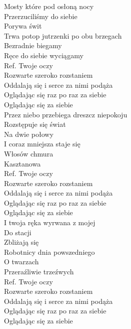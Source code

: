 
Mosty które pod osłoną nocy \tab{} \\
Przerzuciliśmy do siebie  \tab{}\\
Porywa świt  \tab{}\tab{}\\
Trwa potop jutrzenki po obu brzegach \\
Bezradnie biegamy \tab{}\\
Ręce do siebie wyciągamy \tab{} \\
\hops
Ref. Twoje oczy \tab{}\\
 Rozwarte szeroko rozstaniem \\
 Oddalają się i serce za nimi podąża \\
 Oglądając się raz po raz za siebie \\
 Oglądając się za siebie \tab{}\\
\hops
Przez niebo przebiega dreszcz niepokoju \\
Rozstępuje się świat \\
Na dwie połowy \\
I coraz mniejsza staje się \\
Włosów chmura \\
Kasztanowa \\
\hops
Ref. Twoje oczy\\
 Rozwarte szeroko rozstaniem \\
 Oddalają się i serce za nimi podąża \\
 Oglądając się raz po raz za siebie \\
 Oglądając się za siebie \\
\hops
I twoja ręka wyrwana z mojej \\
Do stacji \\
Zbliżają się \\
Robotnicy dnia powszedniego \\
O twarzach \\
Przeraźliwie trzeźwych \\
\hops
Ref. Twoje oczy\\
 Rozwarte szeroko rozstaniem \\
 Oddalają się i serce za nimi podąża \\
 Oglądając się raz po raz za siebie \\
 Oglądając się za siebie \\